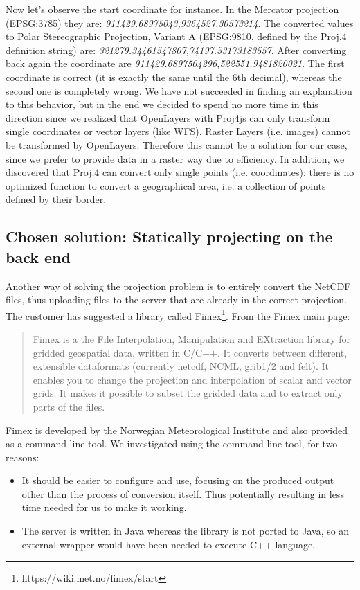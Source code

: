 \documentclass[11pt,a4paper,titlepage,oneside]{report}
\begin{document}
Now let's observe the start coordinate for instance. In the Mercator projection (EPSG:3785) they are: \textit{911429.68975043,9364527.30573214}. The converted values to Polar Stereographic Projection, Variant A (EPSG:9810, defined by the Proj.4 definition string) are: \textit{321279.34461547807,74197.53173183557}.
After converting back again the coordinate are \textit{911429.6897504296,522551.9481820021}. The first coordinate is correct (it is exactly the same until the 6th decimal), whereas the second one is completely wrong.
We have not succeeded in finding an explanation to this behavior, but in the end we decided to spend no more time in this direction since we realized that OpenLayers with Proj4js can only transform single coordinates or vector layers (like \gls{WFS}). Raster Layers (i.e. images) cannot be transformed by OpenLayers. Therefore this cannot be a solution for our case, since we prefer to provide data in a raster way due to efficiency.
In addition, we discovered that Proj.4 can convert only single points (i.e. coordinates): there is no optimized function to convert a geographical area, i.e. a collection of points defined by their border.

\subsection{Chosen solution: Statically projecting on the back end}
\label{sec:ChallengeStaticallyProjectingBackend}
Another way of solving the projection problem is to entirely convert the NetCDF files, thus uploading files to the server that are already in the correct projection.
The customer has suggested a library called \gls{Fimex}\footnote{https://wiki.met.no/fimex/start}.
From the Fimex main page:
\begin{quote}
Fimex is a the File Interpolation, Manipulation and EXtraction library for gridded geospatial data, written in C/C++. It converts between different, extensible dataformats (currently \gls{netcdf}, \gls{NCML}, grib1/2 and felt). It enables you to change the projection and interpolation of scalar and vector grids. It makes it possible to subset the gridded data and to extract only parts of the files.
\end{quote}
Fimex is developed by the Norwegian Meteorological Institute and also provided as a command line tool. 
We investigated using the command line tool, for two reasons:
\begin{itemize}
\item It should be easier to configure and use, focusing on the produced output other than the process of conversion itself. Thus potentially resulting in less time needed for us to make it working.
\item The server is written in Java whereas the library is not ported to Java, so an external wrapper would have been needed to execute C++ language.
\end{itemize}
\end{document}
